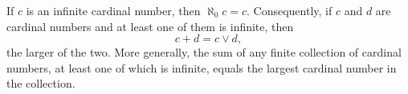 If $c$ is an infinite cardinal number, then $\aleph_0 c = c$. Consequently, if $c$ and $d$ are cardinal numbers and at least one of them is infinite, then
$$
c + d = c \vee d,
$$
the larger of the two. More generally, the sum of any finite collection of cardinal numbers, at least one of which is infinite, equals the largest cardinal number in the collection.
